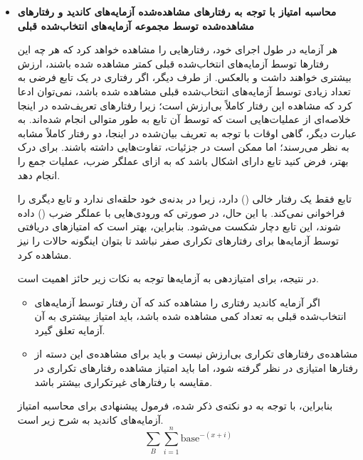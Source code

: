 \begin{itemize}
	\item \textbf{محاسبه امتیاز با توجه به رفتارهای مشاهده‌شده آزمایه‌های کاندید و رفتارهای مشاهده‌شده توسط مجموعه آزمایه‌های انتخاب‌شده قبلی}

هر آزمایه در طول اجرای خود، رفتارهایی را مشاهده خواهد کرد که هر چه این رفتارها توسط آزمایه‌های انتخاب‌شده قبلی کمتر مشاهده شده باشند، ارزش بیشتری خواهند داشت و بالعکس. از طرف دیگر، اگر رفتاری در یک تابع فرضی به تعداد زیادی توسط آزمایه‌های انتخاب‌شده قبلی مشاهده شده باشد، نمی‌توان ادعا کرد که مشاهده این رفتار کاملاً بی‌ارزش است؛ زیرا رفتارهای تعریف‌شده در اینجا خلاصه‌ای از عملیات‌هایی است که توسط آن تابع به طور متوالی انجام شده‌اند. به عبارت دیگر، گاهی اوقات با توجه به تعریف بیان‌شده در اینجا، دو رفتار کاملاً مشابه به نظر می‌رسند؛ اما ممکن است در جزئیات، تفاوت‌هایی داشته باشند. برای درک بهتر، فرض کنید تابع  دارای اشکال باشد که به ازای عملگر ضرب، عملیات جمع را انجام دهد.

\newpage
\begin{figure}[!h]
	\begin{LTR}
		\singlespacing
		
	\end{LTR}
\end{figure}

تابع  فقط یک رفتار خالی (\lr{[]}) دارد، زیرا در بدنه‌ی خود حلقه‌ای ندارد و تابع دیگری را فراخوانی نمی‌کند. با این حال، در صورتی که ورودی‌هایی با عملگر ضرب (\lr{*}) داده شوند، این تابع دچار شکست می‌شود. بنابراین، بهتر است که امتیازهای دریافتی توسط آزمایه‌ها برای رفتارهای تکراری صفر نباشد تا بتوان اینگونه حالات را نیز مشاهده کرد.

در نتیجه، برای امتیازدهی به آزمایه‌ها توجه به نکات زیر حائز اهمیت است.

\begin{itemize}
	\item 
	اگر آزمایه کاندید رفتاری را مشاهده کند که آن رفتار توسط آزمایه‌های انتخاب‌شده قبلی به تعداد کمی مشاهده شده باشد، باید امتیاز بیشتری به آن آزمایه تعلق گیرد.
	\item
	 مشاهده‌ی رفتارهای تکراری بی‌ارزش نیست و باید برای مشاهده‌ی این دسته از رفتارها امتیازی در نظر گرفته شود، اما باید امتیاز مشاهده رفتارهای تکراری در مقایسه با رفتارهای غیرتکراری بیشتر باشد.
\end{itemize}

بنابراین، با توجه به دو نکته‌ی ذکر شده، فرمول پیشنهادی برای محاسبه امتیاز آزمایه‌های کاندید به شرح زیر است.
\[ \sum_{B} \sum_{i=1}^{n}\text{base}^{-(x+i)} \]


\end{itemize}
